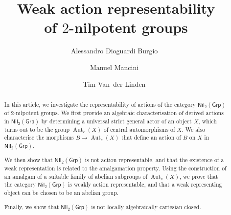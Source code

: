 \documentclass[reqno,hidelinks,a4paper]{amsart}
\date{}
\theoremstyle{plain}
\theoremstyle{definition}
\theoremstyle{remark}
\numberwithin{equation}{section}
\DeclareMathOperator{\Aut}{Aut}
\newcommand{\Grp}{\ensuremath{\mathsf{Grp}}}
\newcommand{\Nil}{\ensuremath{\mathsf{Nil}}}
\begin{document}
\title[Weak action representability of \texorpdfstring{\(2\)}{2}-nilpotent groups]{Weak action representability\\of \texorpdfstring{\(2\)}{2}-nilpotent groups}

\author[A.~Dioguardi Burgio]{Alessandro Dioguardi Burgio~}
\author[M.~Mancini]{Manuel Mancini~}
\author[T.~Van~der Linden]{Tim Van~der Linden~}


\address[Alessandro Dioguardi Burgio]{Dipartimento di Ingegneria, Università degli Studi di Palermo, Viale delle Scienze, 90128 Palermo, Italy.}

\address[Manuel Mancini]{Dipartimento di Matematica e Informatica, Università degli Studi di Palermo, Via Archirafi 34, 90123 Palermo, Italy.}

\address[Manuel Mancini, Tim Van der Linden]{Institut de Recherche en Mathématique et Physique, Université catholique de Louvain, chemin du cyclotron 2 bte L7.01.02, B--1348 Louvain-la-Neuve, Belgium.}

\address[Tim Van der Linden]{Mathematics \& Data Science, Vrije Universiteit Brussel, Pleinlaan 2, B--1050 Brussel, Belgium}


\begin{abstract}
    In this article, we investigate the representability of actions of the category \(\Nil_2(\Grp)\) of \(2\)-nilpotent groups. We first provide an algebraic characterisation of derived actions in \(\Nil_2(\Grp)\) by determining a universal strict general actor of an object \(X\), which turns out to be the group \(\Aut_c(X)\) of central automorphisms of \(X\). We also characterise the morphisms \(B \to \Aut_c(X)\) that define an action of \(B\) on \(X\) in \(\Nil_2(\Grp)\).

    We then show that \(\Nil_2(\Grp)\) is not action representable, and that the existence of a weak representation is related to the amalgamation property. Using the construction of an amalgam of a suitable family of abelian subgroups of \(\Aut_c(X)\), we prove that the category \(\Nil_2(\Grp)\) is weakly action representable, and that a weak representing object can be chosen to be an abelian group.

    Finally, we show that \(\Nil_2(\Grp)\) is not locally algebraically cartesian closed.
\end{abstract}
\end{document}
